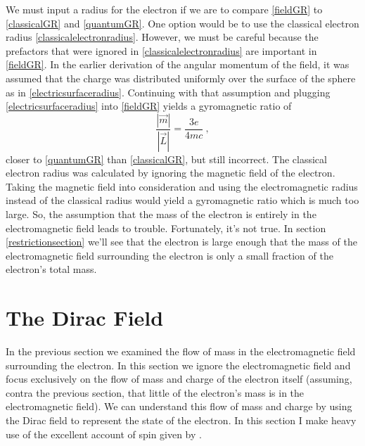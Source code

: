 \documentclass[12pt,secnumarabic,amsmath,amssymb,balancelastpage,nofootinbib]{article}
\begin{document}
We must input a radius for the electron if we are to compare \eqref{fieldGR} to \eqref{classicalGR} and \eqref{quantumGR}.  One option would be to use the classical electron radius \eqref{classicalelectronradius}.  However, we must be careful because the prefactors that were ignored in \eqref{classicalelectronradius} are important in \eqref{fieldGR}.  In the earlier derivation of the angular momentum of the field, it was assumed that the charge was distributed uniformly over the surface of the sphere as in \eqref{electricsurfaceradius}.  Continuing with that assumption and plugging \eqref{electricsurfaceradius} into \eqref{fieldGR} yields a gyromagnetic ratio of
\begin{equation}
\frac{|\vec{m}|}{|\vec{L}|}=\frac{3 e}{4 m c}\ ,
\label{firstGR}
\end{equation}
closer to \eqref{quantumGR} than \eqref{classicalGR}, but still incorrect.  The classical electron radius was calculated by ignoring the magnetic field of the electron.  Taking the magnetic field into consideration and using the electromagnetic radius instead of the classical radius would yield a gyromagnetic ratio which is much too large.  So, the assumption that the mass of the electron is entirely in the electromagnetic field leads to trouble.  Fortunately, it's not true.  In section \ref{restrictionsection} we'll see that the electron is large enough that the mass of the electromagnetic field surrounding the electron is only a small fraction of the electron's total mass.

\section{The Dirac Field}\label{diracfieldsection}

In the previous section we examined the flow of mass in the electromagnetic field surrounding the electron.  In this section we ignore the electromagnetic field and focus exclusively on the flow of mass and charge of the electron itself (assuming, contra the previous section, that little of the electron's mass is in the electromagnetic field).  We can understand this flow of mass and charge by using the Dirac field to represent the state of the electron.  In this section I make heavy use of the excellent account of spin given by \citet{ohanian}.
\end{document}
